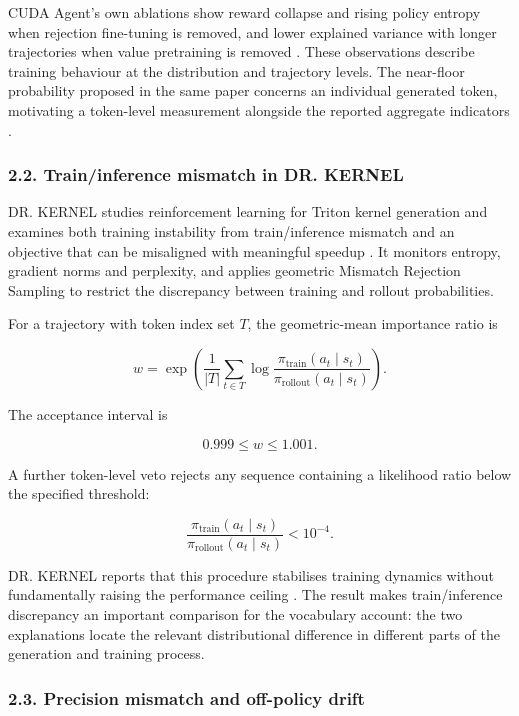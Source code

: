 \documentclass[
  11pt,
]{article}
\begin{document}
CUDA Agent's own ablations show reward collapse and rising policy
entropy when rejection fine-tuning is removed, and lower explained
variance with longer trajectories when value pretraining is removed
\citep{cudaagent}. These observations describe training behaviour at the
distribution and trajectory levels. The near-floor probability proposed
in the same paper concerns an individual generated token, motivating a
token-level measurement alongside the reported aggregate indicators
\citep{cudaagent}.

\hypertarget{dr-kernel-mismatch}{%
\subsubsection{2.2. Train/inference mismatch in DR.
KERNEL}\label{dr-kernel-mismatch}}

DR. KERNEL studies reinforcement learning for Triton kernel generation
and examines both training instability from train/inference mismatch and
an objective that can be misaligned with meaningful speedup
\citep{drkernel}. It monitors entropy, gradient norms and perplexity,
and applies geometric Mismatch Rejection Sampling to restrict the
discrepancy between training and rollout probabilities.

For a trajectory with token index set \(T\), the geometric-mean
importance ratio is

\[
w=\exp\left(\frac{1}{|T|}\sum_{t\in T}
\log\frac{\pi_{\mathrm{train}}(a_t\mid s_t)}
{\pi_{\mathrm{rollout}}(a_t\mid s_t)}\right).
\]

The acceptance interval is

\[
0.999\leq w\leq1.001.
\]

A further token-level veto rejects any sequence containing a likelihood
ratio below the specified threshold:

\[
\frac{\pi_{\mathrm{train}}(a_t\mid s_t)}
{\pi_{\mathrm{rollout}}(a_t\mid s_t)}<10^{-4}.
\]

DR. KERNEL reports that this procedure stabilises training dynamics
without fundamentally raising the performance ceiling \citep{drkernel}.
The result makes train/inference discrepancy an important comparison for
the vocabulary account: the two explanations locate the relevant
distributional difference in different parts of the generation and
training process.

\hypertarget{precision-mismatch-and-off-policy-drift}{%
\subsubsection{2.3. Precision mismatch and off-policy
drift}\label{precision-mismatch-and-off-policy-drift}}
\end{document}
